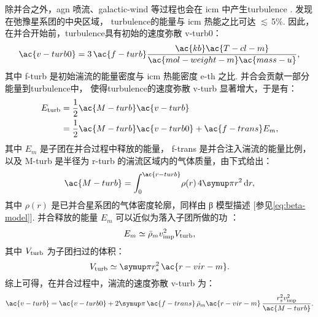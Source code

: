 除并合之外，\ac{agn} 喷流、\ac{galactic-wind} 等过程也会在 \ac{icm}
中产生\ac{turbulence} \cite{vazza2011}.
 发现在弛豫星系团的中央区域，
\ac{turbulence}的能量与 \ac{icm} 热能之比可达 $\lesssim\,$5\%.
因此，在并合开始前，\ac{turbulence}具有初始的速度弥散 \ac{v-turb0}：
\begin{equation}
  \label{eq:v-turb0}
  \ac{v-turb0}
    = 3 \,\ac{f-turb} \frac{\ac{kb} \ac{T-cl-m}}{
        \ac{mol-weight-m} \ac{mass-u}} ,
\end{equation}
其中
\ac{f-turb} 是初始湍流的能量密度与 \ac{icm} 热能密度 \ac{e-th} 之比.
并合会贡献一部分能量到\ac{turbulence}中，
使得\ac{turbulence}的速度弥散 \ac{v-turb} 显著增大，于是有：
\begin{align}
  \label{eq:energy-turb}
  E_{\R{turb}}
    & = \frac{1}{2} \ac{M-turb} \ac{v-turb}  \\
    & = \frac{1}{2} \ac{M-turb} \ac{v-turb0} + \ac{f-trans} E_m ,
\end{align}
其中
$E_m$ 是子团在并合过程中释放的能量，
\ac{f-trans} 是并合注入湍流的能量比例，
以及 \ac{M-turb} 是半径为 \ac{r-turb} 的湍流区域内的气体质量，由下式给出：
\begin{equation}
  \ac{M-turb} = \int_0^{\ac{r-turb}} \! \rho(r) \,4\Cpi r^2 \,\D{r} ,
\end{equation}
其中 $\rho(r)$ 是已并合星系团的气体密度轮廓，同样由 β 模型描述
[参见\autoref{eq:beta-model}].
并合释放的能量 $E_m$ 可以近似为落入子团所做的功 \cite{fujita2003,cassano2005}：
\begin{equation}
  \label{eq:energy-inj}
  E_m \simeq \bar{\rho}_m v_{\mathrm{imp}}^2 V_{\mathrm{turb}} ,
\end{equation}
其中 $V_{\mathrm{turb}}$ 为子团扫过的体积：
\begin{equation}
  V_{\R{turb}} \simeq \Cpi r_s^2 \,\ac{r-vir-m} .
\end{equation}
综上可得，在并合过程中，湍流的速度弥散 \ac{v-turb} 为：
\begin{equation}
  \ac{v-turb}
    = \ac{v-turb0}
    + 2 \Cpi\,\ac{f-trans}\, \bar{\rho}_m \ac{r-vir-m}
      \,\frac{r_s^2 v_{\R{imp}}^2}{\ac{M-turb}} .
\end{equation}


